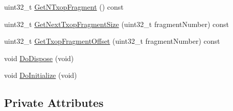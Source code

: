 \begin{DoxyCompactItemize}
uint32\+\_\+t \hyperlink{classns3_1_1EdcaTxopN_a58be060e7f5a3b0f25404df841b9a293}{Get\+N\+Txop\+Fragment} () const 
\item 
uint32\+\_\+t \hyperlink{classns3_1_1EdcaTxopN_a66393612be0215b17eb12e65d6c58cb4}{Get\+Next\+Txop\+Fragment\+Size} (uint32\+\_\+t fragment\+Number) const 
\item 
uint32\+\_\+t \hyperlink{classns3_1_1EdcaTxopN_affa7b4379fca13e2f24a04bdf2a4ae05}{Get\+Txop\+Fragment\+Offset} (uint32\+\_\+t fragment\+Number) const 
\item 
void \hyperlink{classns3_1_1EdcaTxopN_a8d460247e058990e567c5d753fda2f01}{Do\+Dispose} (void)
\item 
void \hyperlink{classns3_1_1EdcaTxopN_a5ad9bb946de25a8eae306b14a9f0ffe3}{Do\+Initialize} (void)
\end{DoxyCompactItemize}
\subsection*{Private Attributes}
